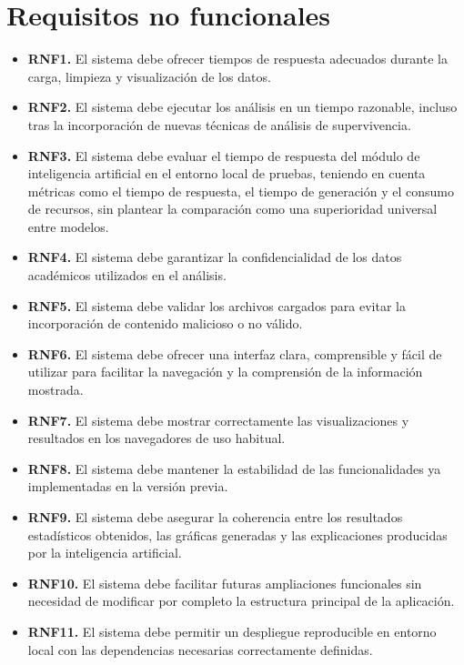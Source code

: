 


\section{Requisitos no funcionales}
\begin{itemize}
    \item \textbf{RNF1.} El sistema debe ofrecer tiempos de respuesta adecuados durante la carga, limpieza y visualización de los datos.
    
    \item \textbf{RNF2.} El sistema debe ejecutar los análisis en un tiempo razonable, incluso tras la incorporación de nuevas técnicas de análisis de supervivencia.
    
    \item \textbf{RNF3.} El sistema debe evaluar el tiempo de respuesta del módulo de inteligencia artificial en el entorno local de pruebas, teniendo en cuenta métricas como el tiempo de respuesta, el tiempo de generación y el consumo de recursos, sin plantear la comparación como una superioridad universal entre modelos.
    
    \item \textbf{RNF4.} El sistema debe garantizar la confidencialidad de los datos académicos utilizados en el análisis.
    
    \item \textbf{RNF5.} El sistema debe validar los archivos cargados para evitar la incorporación de contenido malicioso o no válido.
    
    \item \textbf{RNF6.} El sistema debe ofrecer una interfaz clara, comprensible y fácil de utilizar para facilitar la navegación y la comprensión de la información mostrada.
    
    \item \textbf{RNF7.} El sistema debe mostrar correctamente las visualizaciones y resultados en los navegadores de uso habitual.
    
    \item \textbf{RNF8.} El sistema debe mantener la estabilidad de las funcionalidades ya implementadas en la versión previa.
    
    \item \textbf{RNF9.} El sistema debe asegurar la coherencia entre los resultados estadísticos obtenidos, las gráficas generadas y las explicaciones producidas por la inteligencia artificial.
    
    \item \textbf{RNF10.} El sistema debe facilitar futuras ampliaciones funcionales sin necesidad de modificar por completo la estructura principal de la aplicación.
    
    \item \textbf{RNF11.} El sistema debe permitir un despliegue reproducible en entorno local con las dependencias necesarias correctamente definidas.
\end{itemize}


